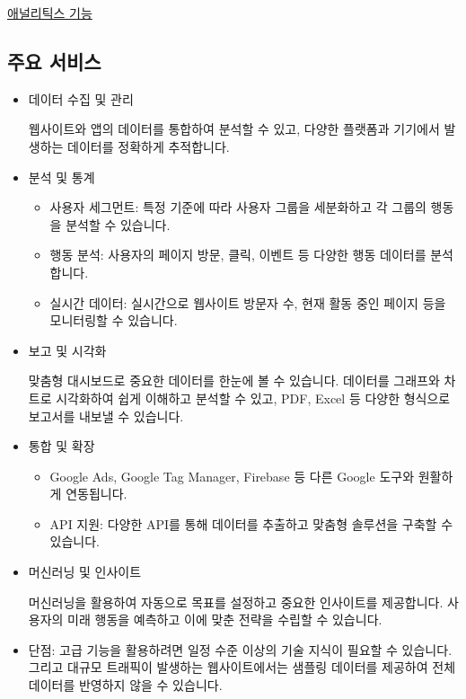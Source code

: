 \documentclass[
  letterpaper,
]{book}
\providecommand{\tightlist}{%
  \setlength{\itemsep}{0pt}\setlength{\parskip}{0pt}}\usepackage{longtable,booktabs,array}
\begin{document}
\href{https://marketingplatform.google.com/intl/ko/about/analytics/features/}{애널리틱스
기능}

\subsection{주요 서비스}\label{uxc8fcuxc694-uxc11cuxbe44uxc2a4}

\begin{itemize}
\item
  데이터 수집 및 관리

  웹사이트와 앱의 데이터를 통합하여 분석할 수 있고, 다양한 플랫폼과
  기기에서 발생하는 데이터를 정확하게 추적합니다.
\item
  분석 및 통계

  \begin{itemize}
  \tightlist
  \item
    사용자 세그먼트: 특정 기준에 따라 사용자 그룹을 세분화하고 각 그룹의
    행동을 분석할 수 있습니다.
  \item
    행동 분석: 사용자의 페이지 방문, 클릭, 이벤트 등 다양한 행동
    데이터를 분석합니다.
  \item
    실시간 데이터: 실시간으로 웹사이트 방문자 수, 현재 활동 중인 페이지
    등을 모니터링할 수 있습니다.
  \end{itemize}
\item
  보고 및 시각화

  맞춤형 대시보드로 중요한 데이터를 한눈에 볼 수 있습니다. 데이터를
  그래프와 차트로 시각화하여 쉽게 이해하고 분석할 수 있고, PDF, Excel 등
  다양한 형식으로 보고서를 내보낼 수 있습니다.
\item
  통합 및 확장

  \begin{itemize}
  \tightlist
  \item
    Google Ads, Google Tag Manager, Firebase 등 다른 Google 도구와
    원활하게 연동됩니다.
  \item
    API 지원: 다양한 API를 통해 데이터를 추출하고 맞춤형 솔루션을 구축할
    수 있습니다.
  \end{itemize}
\item
  머신러닝 및 인사이트

  머신러닝을 활용하여 자동으로 목표를 설정하고 중요한 인사이트를
  제공합니다. 사용자의 미래 행동을 예측하고 이에 맞춘 전략을 수립할 수
  있습니다.
\item
  단점: 고급 기능을 활용하려면 일정 수준 이상의 기술 지식이 필요할 수
  있습니다. 그리고 대규모 트래픽이 발생하는 웹사이트에서는 샘플링
  데이터를 제공하여 전체 데이터를 반영하지 않을 수 있습니다.


\end{itemize}
\end{document}
